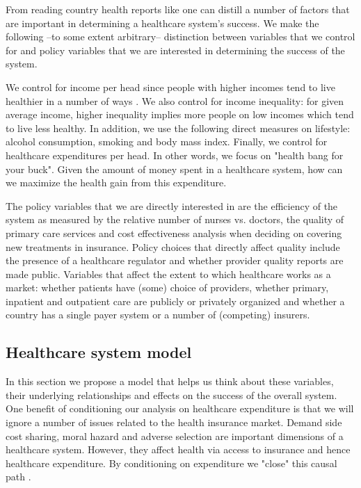 \documentclass[12pt,english,a4paper]{article}
\begin{document}
From reading country health reports like \cite{countryprofileUK} one can distill a number of factors that are important in determining a healthcare system's success. We make the following --to some extent arbitrary-- distinction between variables that we control for and policy variables that we are interested in determining the success of the system.

We control for income per head since people with higher incomes tend to live healthier in a number of ways \citep{socioeconomicstatus}. We also control for income inequality: for given average income, higher inequality implies more people on low incomes which tend to live less healthy. In addition, we use the following direct measures on lifestyle: alcohol consumption, smoking and body mass index. Finally, we control for healthcare expenditures per head. In other words, we focus on "health bang for your buck". Given the amount of money spent in a healthcare system, how can we maximize the health gain from this expenditure.

The policy variables that we are directly interested in are the efficiency of the system as measured by the relative number of nurses vs. doctors, the quality of primary care services and cost effectiveness analysis when deciding on covering new treatments in insurance. Policy choices that directly affect quality include the presence of a healthcare regulator and whether provider quality reports are made public. Variables that affect the extent to which healthcare works as a market: whether patients have (some) choice of providers, whether primary, inpatient and outpatient care are publicly or privately organized and whether a country has a single payer system or a number of (competing) insurers.

\subsection{Healthcare system model}
\label{sec:org26bfbca}

In this section we propose a model that helps us think about these variables, their underlying relationships and effects on the success of the overall system. One benefit of conditioning our analysis on healthcare expenditure is that we will ignore a number of issues related to the health insurance market. Demand side cost sharing, moral hazard and adverse selection are important dimensions of a healthcare system. However, they affect health via access to insurance and hence healthcare expenditure. By conditioning on expenditure we "close" this causal path \citep{Causality2009}.
\end{document}
